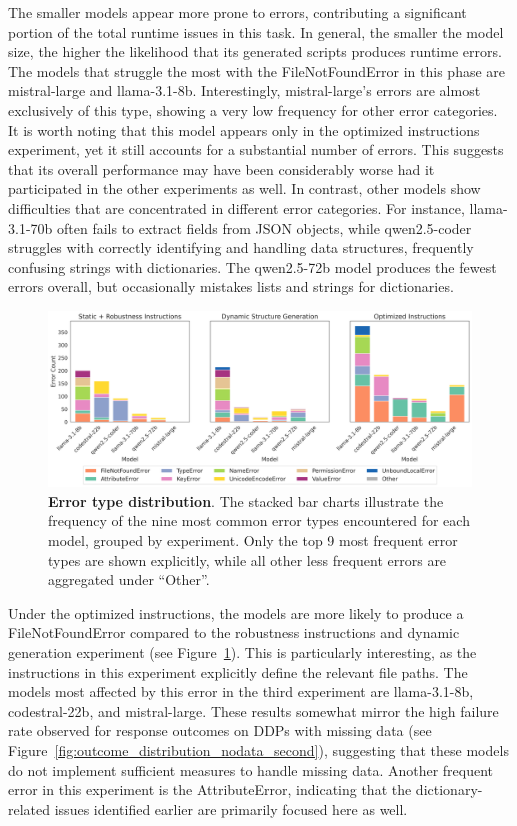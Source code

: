 \documentclass{DESSThesis}
\begin{document}
The smaller models appear more prone to errors, contributing a significant portion of the total runtime issues in this task. In general, the smaller the model size, the higher the likelihood that its generated scripts produces runtime errors. The models that struggle the most with the FileNotFoundError in this phase are mistral-large and llama-3.1-8b. Interestingly, mistral-large's errors are almost exclusively of this type, showing a very low frequency for other error categories. It is worth noting that this model appears only in the optimized instructions experiment, yet it still accounts for a substantial number of errors. This suggests that its overall performance may have been considerably worse had it participated in the other experiments as well. In contrast, other models show difficulties that are concentrated in different error categories. For instance, llama-3.1-70b often fails to extract fields from JSON objects, while qwen2.5-coder struggles with correctly identifying and handling data structures, frequently confusing strings with dictionaries. The qwen2.5-72b model produces the fewest errors overall, but occasionally mistakes lists and strings for dictionaries.

\begin{figure}[ht]
    \centering
    \includegraphics[width=\linewidth]{img/Results/Second Experimental Phase/Error Type Distribution per Model.png}
    \caption[Error type distribution]{\textbf{Error type distribution}. The stacked bar charts illustrate the frequency of the nine most common error types encountered for each model, grouped by experiment. Only the top 9 most frequent error types are shown explicitly, while all other less frequent errors are aggregated under “Other”.}
    \label{fig:error_distribution_second}
\end{figure}

Under the optimized instructions, the models are more likely to produce a FileNotFoundError compared to the robustness instructions and dynamic generation experiment (see Figure~\ref{fig:error_distribution_second}). This is particularly interesting, as the instructions in this experiment explicitly define the relevant file paths. The models most affected by this error in the third experiment are llama-3.1-8b, codestral-22b, and mistral-large. These results somewhat mirror the high failure rate observed for response outcomes on DDPs with missing data (see Figure~\ref{fig:outcome_distribution_nodata_second}), suggesting that these models do not implement sufficient measures to handle missing data. Another frequent error in this experiment is the AttributeError, indicating that the dictionary-related issues identified earlier are primarily focused here as well.
\end{document}
